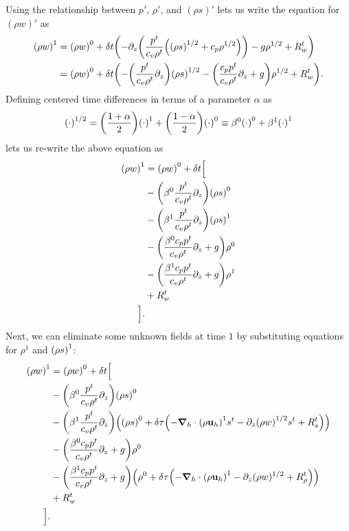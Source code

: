 \documentclass[11pt]{article}
\begin{document}
Using the relationship between $p'$, $\rho'$, and $(\rho s)'$ lets us write the equation for $(\rho w)'$ as
\begin{align*}
\qty(\rho w)^1 &= \qty(\rho w)^0 + \delta t \qty(-\partial_z \qty(\frac{p^t}{c_v \rho^t} \qty ( \qty(\rho s)^{1/2} + c_p \rho^{1/2})) - g \rho^{1/2} + R_w^t) \\
&= \qty(\rho w)^0 + \delta t \qty(-\qty(\frac{p^t}{c_v \rho^t} \partial_z) \qty(\rho s)^{1/2} - \qty(\frac{c_p p^t}{c_v \rho^t} \partial_z + g) \rho^{1/2} + R_w^t).
\end{align*}
Defining centered time differences in terms of a parameter $\alpha$ as
\begin{equation*}
\qty(\cdot)^{1/2} = \qty(\frac{1 + \alpha}{2}) \qty(\cdot)^1 + \qty(\frac{1 - \alpha}{2}) \qty(\cdot)^0 \equiv \beta^0 \qty(\cdot)^0 + \beta^1 \qty(\cdot)^1
\end{equation*}
lets us re-write the above equation as
\begin{align*}
\qty(\rho w)^1 &= \qty(\rho w)^0 + \delta t \Big[ \\
& -\qty(\beta^0\frac{p^t}{c_v \rho^t} \partial_z) \qty(\rho s)^0 \\
& -\qty(\beta^1\frac{p^t}{c_v \rho^t} \partial_z) \qty(\rho s)^1 \\ 
& - \qty(\frac{\beta^0 c_p p^t}{c_v \rho^t} \partial_z + g) \rho^0 \\
& - \qty(\frac{\beta^1 c_p p^t}{c_v \rho^t} \partial_z + g) \rho^1 \\
& + R_w^t \\
\Big ].
\end{align*}
Next, we can eliminate some unknown fields at time $1$ by substituting equations for $\rho^1$ and $\qty(\rho s)^1$:
\begin{align*}
\qty(\rho w)^1 &= \qty(\rho w)^0 + \delta t \Big[ \\
& -\qty(\beta^0\frac{p^t}{c_v \rho^t} \partial_z) \qty(\rho s)^0 \\
& -\qty(\beta^1\frac{p^t}{c_v \rho^t} \partial_z) \qty(\qty(\rho s)^0 + \delta \tau \qty(-\grad_h \cdot \qty(\rho {\bf u}_h)^{1} s^t - \partial_z \qty(\rho w)^{1/2} s^t + R_s^t)) \\ 
& - \qty(\frac{\beta^0 c_p p^t}{c_v \rho^t} \partial_z + g) \rho^0 \\
& - \qty(\frac{\beta^1 c_p p^t}{c_v \rho^t} \partial_z + g)\qty (\rho^0 + \delta \tau \qty(-\grad_h \cdot \qty(\rho {\bf u}_h)^{1} -\partial_z (\rho w)^{1/2} + R_{\rho}^t)) \\
& + R_w^t \\
\Big ].
\end{align*}
\end{document}
